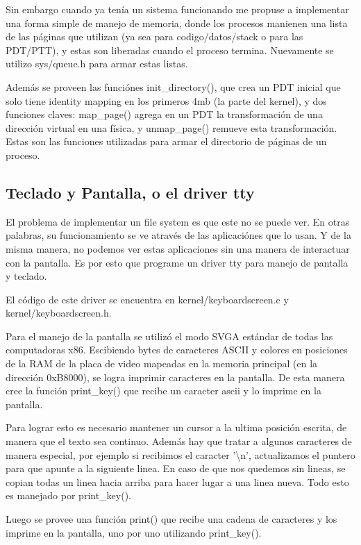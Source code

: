 Sin embargo cuando ya tenía un sistema funcionando me propuse a implementar una
forma simple de manejo de memoria, donde los procesos manienen una lista de las
páginas que utilizan (ya sea para codigo/datos/stack o para las PDT/PTT), y
estas son liberadas cuando el proceso termina. Nuevamente se utilizo
sys/queue.h para armar estas listas.

Además se proveen las funciónes init\_directory(), que crea un PDT inicial que
solo tiene identity mapping en los primeros 4mb (la parte del kernel), y dos
funciones claves: map\_page() agrega en un PDT la transformación de una
dirección virtual en una física, y unmap\_page() remueve esta transformación.
Estas son las funciones utilizadas para armar el directorio de páginas de un
proceso.

\subsection{Teclado y Pantalla, o el driver tty}

El problema de implementar un file system es que este no se puede ver. En otras
palabras, su funcionamiento se ve através de las aplicaciónes que lo usan. Y de
la misma manera, no podemos ver estas aplicaciones sin una manera de
interactuar con la pantalla. Es por esto que programe un driver tty para manejo
de pantalla y teclado.

El código de este driver se encuentra en kernel/keyboardscreen.c y
kernel/keyboardscreen.h.

Para el manejo de la pantalla se utilizó el modo SVGA estándar de todas las
computadoras x86. Escibiendo bytes de caracteres ASCII y colores en posiciones
de la RAM de la placa de video mapeadas en la memoria principal (en la
dirección 0xB8000), se logra imprimir caracteres en la pantalla. De esta manera
cree la función print\_key() que recibe un caracter ascii y lo imprime en la
pantalla.

Para lograr esto es necesario mantener un cursor a la ultima posición escrita,
de manera que el texto sea continuo. Además hay que tratar a algunos caracteres
de manera especial, por ejemplo si recibimos el caracter '\textbackslash n',
actualizamos el puntero para que apunte a la siguiente linea. En caso de que
nos quedemos sin lineas, se copian todas un linea hacia arriba para hacer
lugar a una linea nueva. Todo esto es manejado por print\_key().

Luego se provee una función print() que recibe una cadena de caracteres y los
imprime en la pantalla, uno por uno utilizando print\_key().

